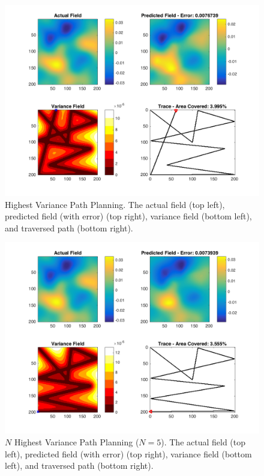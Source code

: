 \begin{figure}[htb!]
    \centering
    \includegraphics[width=0.8\linewidth]{figures/sim_figures/nhv_3_5p_200x200_sf_20_seed_2}
	\captionsetup{skip=0.25\baselineskip}
	\ssp
    \caption{Highest Variance Path Planning. The actual field (top left), predicted field (with error) (top right), variance field (bottom left), and traversed path (bottom right).}
\end{figure}

\begin{figure}[htb!]
    \centering
    \includegraphics[width=0.8\linewidth]{figures/sim_figures/nnhv_3_5p_200x200_sf_20_seed_2}
    \captionsetup{skip=0.25\baselineskip}
    \ssp
    \caption{$N$ Highest Variance Path Planning ($N=5$). The actual field (top left), predicted field (with error) (top right), variance field (bottom left), and traversed path (bottom right).}
\end{figure}

